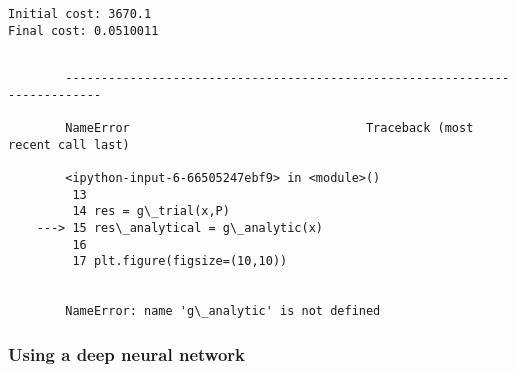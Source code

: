\documentclass[11pt]{article}
\begin{document}
    \begin{Verbatim}[commandchars=\\\{\}]
Initial cost: 3670.1
Final cost: 0.0510011

    \end{Verbatim}

    \begin{Verbatim}[commandchars=\\\{\}]

        ---------------------------------------------------------------------------

        NameError                                 Traceback (most recent call last)

        <ipython-input-6-66505247ebf9> in <module>()
         13 
         14 res = g\_trial(x,P)
    ---> 15 res\_analytical = g\_analytic(x)
         16 
         17 plt.figure(figsize=(10,10))


        NameError: name 'g\_analytic' is not defined

    \end{Verbatim}

    \hypertarget{using-a-deep-neural-network}{%
\subsubsection{Using a deep neural
network}\label{using-a-deep-neural-network}}
\end{document}
